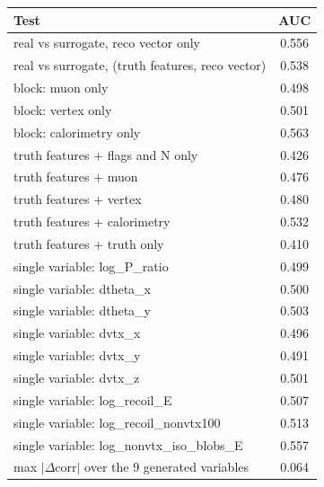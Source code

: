 \begin{tabular}{lc}
\toprule
Test & AUC \\
\midrule
real vs surrogate, reco vector only & 0.556 \\
real vs surrogate, (truth features, reco vector) & 0.538 \\
\midrule
block: muon only & 0.498 \\
block: vertex only & 0.501 \\
block: calorimetry only & 0.563 \\
truth features + flags and N only & 0.426 \\
truth features + muon & 0.476 \\
truth features + vertex & 0.480 \\
truth features + calorimetry & 0.532 \\
truth features + truth only & 0.410 \\
single variable: log\_P\_ratio & 0.499 \\
single variable: dtheta\_x & 0.500 \\
single variable: dtheta\_y & 0.503 \\
single variable: dvtx\_x & 0.496 \\
single variable: dvtx\_y & 0.491 \\
single variable: dvtx\_z & 0.501 \\
single variable: log\_recoil\_E & 0.507 \\
single variable: log\_recoil\_nonvtx100 & 0.513 \\
single variable: log\_nonvtx\_iso\_blobs\_E & 0.557 \\
\midrule
max $|\Delta$corr$|$ over the 9 generated variables & 0.064 \\
\bottomrule
\end{tabular}

